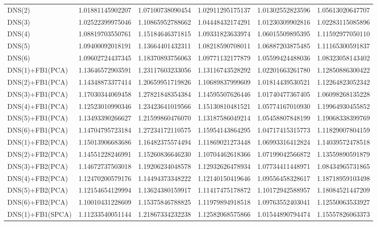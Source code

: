 \begin{table}[h]
\begin{adjustbox}{totalheight=\baselineskip}
\begin{tabular}{lSSSSS}
DNS(2) & 1.01881145902207 & 1.07100738090454 & 1.02911295175137 & 1.01302552823596 & 1.05613020647707 \\ 
DNS(3) & 1.02522399975046 & 1.10865952788662 & 1.04448432174291 & 1.01230309902816 & 1.02283115085896 \\ 
DNS(4) & 1.08819703550761 & 1.15184646371815 & 1.09331823633974 & 1.06015509895395 & 1.11592977050110 \\ 
DNS(5) & 1.09400092018191 & 1.13664401432311 & 1.08218590708011 & 1.06887203875485 & 1.11165300591837 \\ 
DNS(6) & 1.09602724437345 & 1.18370893756063 & 1.09771132177879 & 1.05599424488036 & 1.08323058143402 \\ 
DNS(1)+FB1(PCA) & 1.13646572903591 & 1.23117603233056 & 1.13116743528292 & 1.02201663261780 & 1.12850886300422 \\ 
DNS(2)+FB1(PCA) & 1.14348873377414 & 1.20659951719826 & 1.10689837999609 & 1.01814439530521 & 1.12264823052342 \\ 
DNS(3)+FB1(PCA) & 1.17030344069458 & 1.27821848354384 & 1.14595507626446 & 1.01740477367405 & 1.06098268135228 \\ 
DNS(4)+FB1(PCA) & 1.12523010990346 & 1.23423641019566 & 1.15130810481521 & 1.05774167010930 & 1.19964930455852 \\ 
DNS(5)+FB1(PCA) & 1.13493390266627 & 1.21599860476070 & 1.13187586049214 & 1.05458807848199 & 1.19068338399769 \\ 
DNS(6)+FB1(PCA) & 1.14704795723184 & 1.27234172110575 & 1.15954143864295 & 1.04717415315773 & 1.11829007804159 \\ 
DNS(1)+FB2(PCA) & 1.15013906683686 & 1.16482375574494 & 1.11869021273448 & 1.06993316412824 & 1.14039572478518 \\ 
DNS(2)+FB2(PCA) & 1.14551228246991 & 1.15260836646230 & 1.10704462618366 & 1.07199042566872 & 1.13559890591879 \\ 
DNS(3)+FB2(PCA) & 1.14672737503018 & 1.19206234048578 & 1.12932626478934 & 1.07734411448971 & 1.08434965731865 \\ 
DNS(4)+FB2(PCA) & 1.12470200579176 & 1.14494373348222 & 1.12140150419646 & 1.09556458328617 & 1.18718959103498 \\ 
DNS(5)+FB2(PCA) & 1.12154654129994 & 1.13624380159917 & 1.11417475178872 & 1.10172942588957 & 1.18084521447209 \\ 
DNS(6)+FB2(PCA) & 1.10010431228609 & 1.15375846788825 & 1.11979894918518 & 1.09763552403041 & 1.12550063533927 \\ 
DNS(1)+FB1(SPCA) & 1.11233540051144 & 1.21867334232238 & 1.12582068575866 & 1.01544890794474 & 1.15557826063373 \\ 

\end{tabular}
\end{adjustbox}
\end{table}
